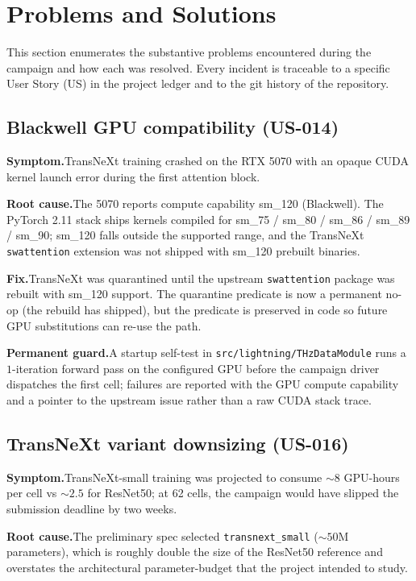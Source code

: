 \section{Problems and Solutions}
\label{sec:problems}

This section enumerates the substantive problems encountered during the
campaign and how each was resolved. Every incident is traceable to a
specific User Story (US) in the project ledger and to the git history of
the repository.

\subsection{Blackwell GPU compatibility (US-014)}
\textbf{Symptom.}\quad TransNeXt training crashed on the RTX 5070 with an
opaque CUDA kernel launch error during the first attention block.

\textbf{Root cause.}\quad The 5070 reports compute capability sm\_120
(Blackwell). The PyTorch 2.11 stack ships kernels compiled for
sm\_75 / sm\_80 / sm\_86 / sm\_89 / sm\_90; sm\_120 falls outside the
supported range, and the TransNeXt \texttt{swattention} extension was not
shipped with sm\_120 prebuilt binaries.

\textbf{Fix.}\quad TransNeXt was quarantined until the upstream
\texttt{swattention} package was rebuilt with sm\_120 support. The
quarantine predicate is now a permanent no-op (the rebuild has shipped),
but the predicate is preserved in code so future GPU substitutions can
re-use the path.

\textbf{Permanent guard.}\quad A startup self-test in
\texttt{src/lightning/THzDataModule} runs a $1$-iteration forward pass
on the configured GPU before the campaign driver dispatches the first
cell; failures are reported with the GPU compute capability and a pointer
to the upstream issue rather than a raw CUDA stack trace.

\subsection{TransNeXt variant downsizing (US-016)}
\textbf{Symptom.}\quad TransNeXt-small training was projected to consume
$\sim 8$ GPU-hours per cell vs $\sim 2.5$ for ResNet50; at 62 cells, the
campaign would have slipped the submission deadline by two weeks.

\textbf{Root cause.}\quad The preliminary spec selected
\texttt{transnext\_small} ($\sim 50$M parameters), which is roughly double
the size of the ResNet50 reference and overstates the architectural
parameter-budget that the project intended to study.

